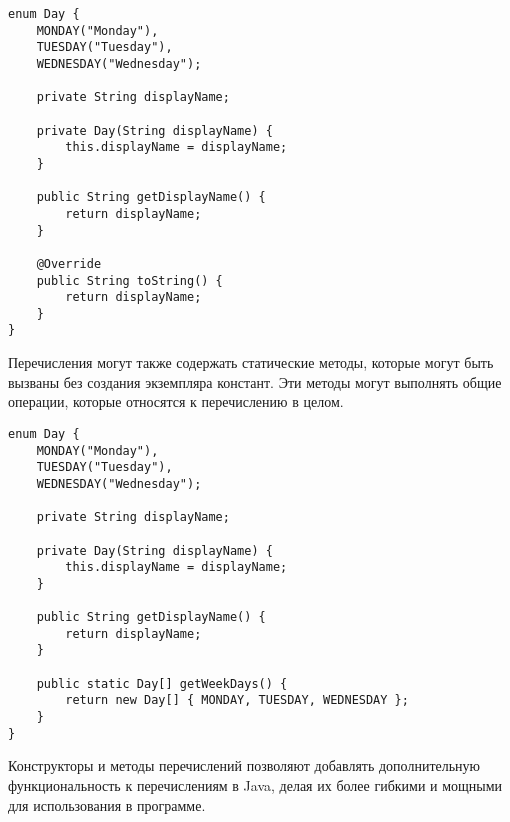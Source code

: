 \documentclass[12pt, a4paper]{book}%
\makeatletter
\renewcommand{\section}{\@startsection{section}{1}{1pt}%
{4.0ex plus -0.2ex minus -0.2ex}{2.0ex plus 0.2ex}{\centering\bf}}%
\makeatother
\begin{document}
{ \begin{lstlisting}
enum Day {
    MONDAY("Monday"),
    TUESDAY("Tuesday"),
    WEDNESDAY("Wednesday");

    private String displayName;

    private Day(String displayName) {
        this.displayName = displayName;
    }

    public String getDisplayName() {
        return displayName;
    }

    @Override
    public String toString() {
        return displayName;
    }
}
\end{lstlisting}

Перечисления могут также содержать статические методы, которые могут быть вызваны без создания экземпляра констант. Эти методы могут выполнять общие операции, которые относятся к перечислению в целом.

 \begin{lstlisting}
enum Day {
    MONDAY("Monday"),
    TUESDAY("Tuesday"),
    WEDNESDAY("Wednesday");

    private String displayName;

    private Day(String displayName) {
        this.displayName = displayName;
    }

    public String getDisplayName() {
        return displayName;
    }

    public static Day[] getWeekDays() {
        return new Day[] { MONDAY, TUESDAY, WEDNESDAY };
    }
}
\end{lstlisting}

Конструкторы и методы перечислений позволяют добавлять дополнительную функциональность к перечислениям в Java, делая их более гибкими и мощными для использования в программе.




}
\end{document}
